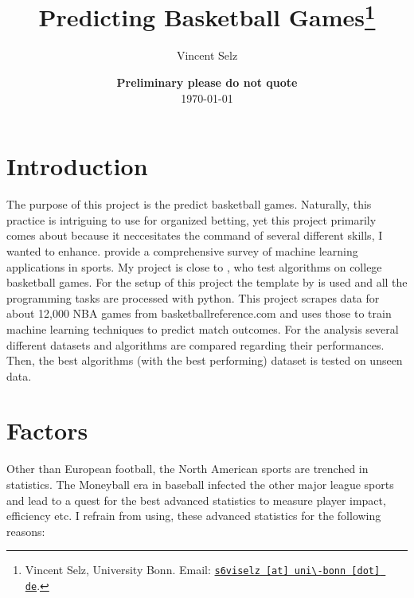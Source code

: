 \documentclass[11pt, a4paper, leqno]{article}
\begin{document}
\title{Predicting Basketball Games\thanks{Vincent Selz, University Bonn. Email: \href{mailto:s6viselz@uni\-bonn.de}{\nolinkurl{s6viselz [at] uni\-bonn [dot] de}}.}}

\author{Vincent Selz}

\date{
{\bf Preliminary \-\- please do not quote}
\\[1ex]
\today
}

\maketitle

\tableofcontents

\clearpage
\section{Introduction}

The purpose of this project is the predict basketball games. Naturally, this practice is intriguing to use for organized betting, yet this project primarily comes about because it neccesitates the command of several different skills, I wanted to enhance. \cite{survey} provide a comprehensive survey of machine learning applications in sports. My project is close to \cite{Zimbo}, who test algorithms on college basketball games. For the setup of this project the template by \cite{GaudeckerEconProjectTemplates} is used and all the programming tasks are processed with python. This project scrapes data for about 12,000 NBA games from basketball\-reference.com and uses those to train machine learning techniques to predict match outcomes. For the analysis several different datasets and algorithms are compared regarding their performances. Then, the best algorithms (with the best performing) dataset is tested on unseen data.


\section{Factors}


Other than European football, the North American sports are trenched in statistics. The Moneyball era in baseball infected the other major league sports and lead to a quest for the best advanced statistics to measure player impact, efficiency etc. I refrain from using, these advanced statistics for the following reasons:
\end{document}
